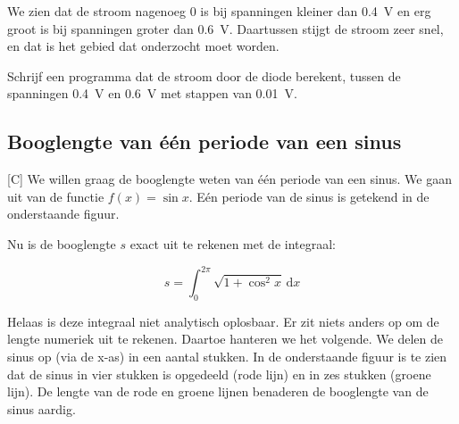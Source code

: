 \documentclass[a4paper,10pt,fleqn,twoside]{article}
\begin{document}
We zien dat de stroom nagenoeg 0 is bij spanningen kleiner dan \SI{0.4}{\volt} en erg groot is bij spanningen groter dan \SI{0.6}{\volt}. Daartussen stijgt de stroom zeer snel, en dat is het gebied dat onderzocht moet worden.

Schrijf een programma dat de stroom door de diode berekent, tussen de spanningen \SI{0.4}{\volt} en \SI{0.6}{\volt} met stappen van \SI{0.01}{\volt}.

\subsection{Booglengte van één periode van een sinus}[C]
We willen graag de booglengte weten van één periode van een sinus. We gaan uit van de functie $f(x) = \sin x$. Eén periode van de sinus is getekend in de onderstaande figuur.

\begin{figure}[H]
\centering
{}%
\end{figure}

Nu is de booglengte $s$ exact uit te rekenen met de integraal:

\begin{equation*}
s = \int_0^{2\pi} \sqrt{1+\cos^2 x}\, \mathrm{d}x
\end{equation*}

Helaas is deze integraal niet analytisch oplosbaar. Er zit niets anders op om de lengte numeriek uit te rekenen. Daartoe hanteren we het volgende. We delen de sinus op (via de x-as) in een aantal stukken. In de onderstaande figuur is te zien dat de sinus in vier stukken is opgedeeld (rode lijn) en in zes stukken (groene lijn). De lengte van de rode en groene lijnen benaderen de booglengte van de sinus aardig.

\begin{figure}[H]
\centering
{}%
\end{figure}
\end{document}

